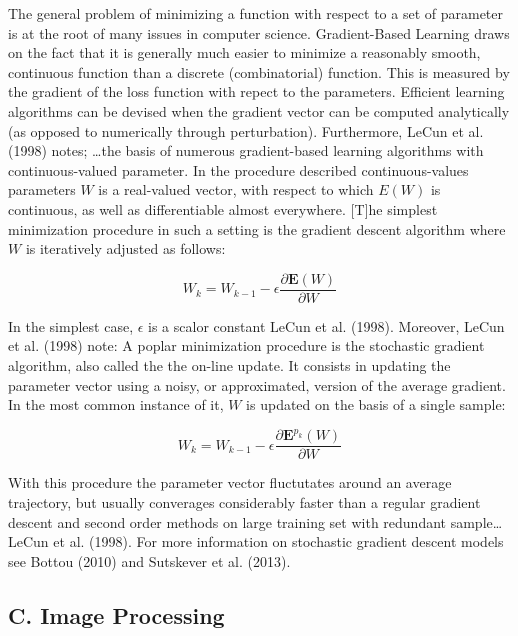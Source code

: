\documentclass[conference,final,]{IEEEtran}
\begin{document}
The general problem of minimizing a function with respect to a set of
parameter is at the root of many issues in computer science.
Gradient-Based Learning draws on the fact that it is generally much
easier to minimize a reasonably smooth, continuous function than a
discrete (combinatorial) function. This is measured by the gradient of
the loss function with repect to the parameters. Efficient learning
algorithms can be devised when the gradient vector can be computed
analytically (as opposed to numerically through perturbation).
Furthermore, LeCun et al. (1998) notes; \ldots{}the basis of numerous
gradient-based learning algorithms with continuous-valued parameter. In
the procedure described continuous-values parameters \(W\) is a
real-valued vector, with respect to which \(E(W)\) is continuous, as
well as differentiable almost everywhere. {[}T{]}he simplest
minimization procedure in such a setting is the gradient descent
algorithm where \(W\) is iteratively adjusted as follows:

\begin{equation}
    W_k =  W_{k-1}-\epsilon\frac{\partial \mathbf{E}(W)}{\partial W}
\end{equation}

In the simplest case, \(\epsilon\) is a scalor constant LeCun et al.
(1998). Moreover, LeCun et al. (1998) note: A poplar minimization
procedure is the stochastic gradient algorithm, also called the the
on-line update. It consists in updating the parameter vector using a
noisy, or approximated, version of the average gradient. In the most
common instance of it, \(W\) is updated on the basis of a single sample:

\begin{equation}
    W_k =  W_{k-1}-\epsilon\frac{\partial \mathbf{E}^{p_k}(W)}{\partial W}
\end{equation}

With this procedure the parameter vector fluctutates around an average
trajectory, but usually converages considerably faster than a regular
gradient descent and second order methods on large training set with
redundant sample\ldots{}LeCun et al. (1998). For more information on
stochastic gradient descent models see Bottou (2010) and Sutskever et
al. (2013).

\subsection{C. Image Processing}\label{c.-image-processing}
\end{document}
